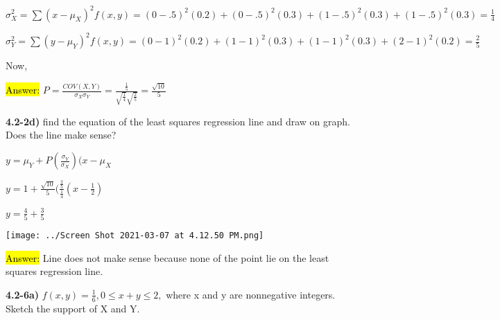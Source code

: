 \documentclass{article}
\begin{document}
\vspace{2mm}

$\sigma_{X}^{2}= \sum (x-\mu_{X})^{2} f(x,y)=(0-.5)^{2}(0.2)+(0-.5)^{2}(0.3)+(1-.5)^{2}(0.3)+(1-.5)^{2}(0.3)=\frac{1}{4}$


$\sigma_{Y}^{2}= \sum (y-\mu_{Y})^{2} f(x,y)=(0-1)^{2}(0.2)+(1-1)^{2}(0.3)+(1-1)^{2}(0.3)+(2-1)^{2}(0.2)=\frac{2}{5}$

\vspace{4mm}

Now, 

\vspace{2mm}

\hl{Answer:}  $P=\frac{COV(X,Y)}{\sigma_{X}\sigma_{Y}}=\frac{\frac{1}{5}}{\sqrt{\frac{1}{4}}\sqrt{\frac{2}{5}}}=\frac{\sqrt{10}}{5}$



\vspace{4mm}

\newpage
\textbf{ 4.2-2d)} find the equation of the least squares regression line and draw on graph. Does the line make sense?

\vspace{2mm}

$y=\mu_{Y}+P(\frac{\sigma_{Y}}{\sigma_{X}})(x-\mu_{X}$

\vspace{2mm}

$y=1+\frac{\sqrt{10}}{5}(\frac{\frac{2}{5}}{\frac{1}{4}}(x-\frac{1}{2})$

 $y=\frac{4}{5}+\frac{3}{5}$


\vspace{2mm}

\texttt{[image: ../Screen Shot 2021-03-07 at 4.12.50 PM.png]}

\vspace{2mm}

\hl{Answer:}  Line does not make sense because none of the point lie on the least squares regression line. 













\newpage
\textbf{ 4.2-6a)} $f(x,y)=\frac{1}{6}, 0 \le x+y \le 2,$ where x and y are nonnegative integers. Sketch the support of X and Y.

\vspace{2mm}
\end{document}
